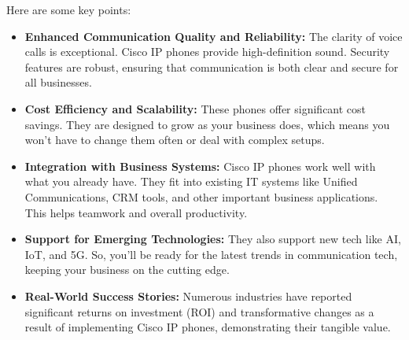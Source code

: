 \documentclass[11pt,a4paper]{article}
\begin{document}
Here are some key points:

\begin{itemize}
    \item \textbf{Enhanced Communication Quality and Reliability:} The clarity of voice calls is exceptional. Cisco IP phones provide high-definition sound. Security features are robust, ensuring that communication is both clear and secure for all businesses.
    \item \textbf{Cost Efficiency and Scalability:} These phones offer significant cost savings. They are designed to grow as your business does, which means you won’t have to change them often or deal with complex setups.
    \item \textbf{Integration with Business Systems:} Cisco IP phones work well with what you already have. They fit into existing IT systems like Unified Communications, CRM tools, and other important business applications. This helps teamwork and overall productivity.
    \item \textbf{Support for Emerging Technologies:} They also support new tech like AI, IoT, and 5G. So, you’ll be ready for the latest trends in communication tech, keeping your business on the cutting edge.
    \item \textbf{Real-World Success Stories:} Numerous industries have reported significant returns on investment (ROI) and transformative changes as a result of implementing Cisco IP phones, demonstrating their tangible value.
\end{itemize}
\end{document}
